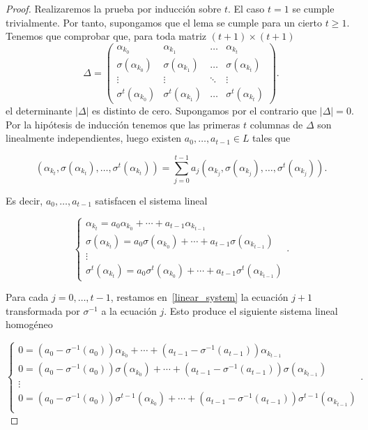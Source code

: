 \begin{proof}
    Realizaremos la prueba por inducción sobre \(t\). El caso \(t = 1\) se cumple trivialmente. Por tanto, supongamos que el lema se cumple para un cierto  \(t \geq 1\). Tenemos que comprobar que, para toda matriz \((t+1) \times (t+1)\)
    \[
    \Delta =
    \begin{pmatrix}
        \alpha_{k_0} & \alpha_{k_1} & \dots & \alpha_{k_{t}} \\
        \sigma(\alpha_{k_0}) & \sigma(\alpha_{k_1}) & \dots & \sigma(\alpha_{k_{t}}) \\
        \vdots & \vdots & \ddots & \vdots \\
        \sigma^{t}(\alpha_{k_0}) & \sigma^{t}(\alpha_{k_1}) & \dots & \sigma^{t}(\alpha_{k_{t}})

    \end{pmatrix}
    .\]
el determinante \(|\Delta|\) es distinto de cero. Supongamos por el contrario que \(|\Delta| = 0\). Por la hipótesis de inducción tenemos que las primeras \(t\) columnas de \(\Delta\) son linealmente independientes, luego existen \(a_0, \dots, a_{t-1} \in L\) tales que

\[
(\alpha_{k_t}, \sigma(\alpha_{k_t}), \dots, \sigma^t(\alpha_{k_t})) = \sum_{j=0}^{t-1} a_j(\alpha_{k_j}, \sigma(\alpha_{k_j}), \dots, \sigma^t(\alpha_{k_j}))
.\]

Es decir, \(a_0, \dots, a_{t-1}\) satisfacen el sistema lineal

\begin{equation}
\label{linear_system}
\begin{cases}
    \alpha_{k_t} = a_0\alpha_{k_0} + \cdots + a_{t-1}\alpha_{k_{t-1}} \\
    \sigma(\alpha_{k_t}) = a_0\sigma(\alpha_{k_0}) + \cdots + a_{t-1}\sigma(\alpha_{k_{t-1}}) \\
    \vdots \\
    \sigma^t(\alpha_{k_t}) = a_0\sigma^t(\alpha_{k_0}) + \cdots + a_{t-1}\sigma^t(\alpha_{k_{t-1}})
\end{cases}
.
\end{equation}

Para cada \(j = 0, \dots, t-1\), restamos en~\eqref{linear_system} la ecuación \(j+1\) transformada por \(\sigma^{-1}\) a la ecuación \(j\). Esto produce el siguiente sistema lineal homogéneo

\begin{equation}
\label{hom_liner_system}
\begin{cases}
0 = (a_0 - \sigma^{-1}(a_0))\alpha_{k_0} + \cdots + (a_{t-1} - \sigma^{-1}(a_{t-1}))\alpha_{k_{t-1}} \\
0 = (a_0 - \sigma^{-1}(a_0))\sigma(\alpha_{k_0}) + \cdots + (a_{t-1} - \sigma^{-1}(a_{t-1}))\sigma(\alpha_{k_{t-1}}) \\
\vdots \\
0 = (a_0 - \sigma^{-1}(a_0))\sigma^{t-1}(\alpha_{k_0}) + \cdots + (a_{t-1} - \sigma^{-1}(a_{t-1}))\sigma^{t-1}(\alpha_{k_{t-1}}) \\
\end{cases}
.
\end{equation}


\end{proof}
